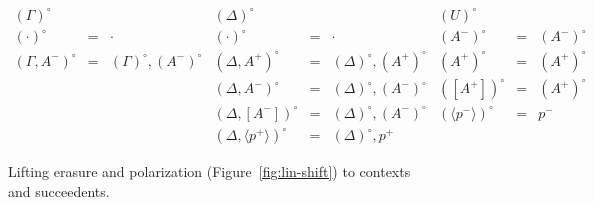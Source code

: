 \begin{figure}
{\small \[
\begin{array}{rcl|rcl|rcl}
{(\Gamma)^\circ} & & &
{(\Delta)^\circ} & & &
{(U)^\circ} & & 
\\
(\cdot)^\circ & \!\!\!=\!\!\! & \cdot &
(\cdot)^\circ & \!\!\!=\!\!\! & \cdot &
(A^-)^\circ & \!\!\!=\!\!\! & (A^-)^\circ
\\
(\Gamma, A^-)^\circ & \!\!\!=\!\!\! & (\Gamma)^\circ, (A^-)^\circ &
(\Delta, A^+)^\circ & \!\!\!=\!\!\! & (\Delta)^\circ, (A^+)^\circ &
(A^+)^\circ & \!\!\!=\!\!\! & (A^+)^\circ
\\
& & & 
(\Delta, A^-)^\circ & \!\!\!=\!\!\! & (\Delta)^\circ, (A^-)^\circ &
([A^+])^\circ & \!\!\!=\!\!\! & (A^+)^\circ 
\\
& & &
(\Delta, [ A^- ])^\circ & \!\!\!=\!\!\! & (\Delta)^\circ, (A^-)^\circ & 
(\langle p^- \rangle)^\circ & \!\!\!=\!\!\! & p^-
\\
& & &
(\Delta, \langle p^+ \rangle)^\circ & \!\!\!=\!\!\! & (\Delta)^\circ, p^+ & 
& &
\end{array}\]}
\caption{Lifting erasure and polarization (Figure~\ref{fig:lin-shift}) to
contexts and succeedents.}
\label{fig:lin-shift-ctx}
\end{figure}
